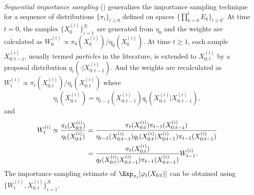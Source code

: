 \documentclass[11pt, fontset=Minion, showoverfull,
bib, mintcode, minted=cache]{marticle}
\begin{document}
\emph{Sequential importance sampling} (\sis) generalizes the importance
sampling technique for a sequence of distributions $\{\pi_t\}_{t\ge0}$ defined
on spaces $\{\prod_{k=0}^tE_k\}_{t\ge0}$. At time $t = 0$, the samples
$\{X_0^{(i)}\}_{i=1}^N$ are generated from $\eta_0$ and the weights are
calculated as $W_0^{(i)} \propto \pi_0(X_0^{(i)})/\eta_0(X_0^{(i)})$. At time
$t\ge1$, each sample $X_{0:t-1}^{(i)}$, usually termed \emph{particles} in the
literature, is extended to $X_{0:t}^{(i)}$ by a proposal distribution
$q_t(\cdot|X_{0:t-1}^{(i)})$. And the weights are recalculated as $W_t^{(i)}
\propto \pi_t(X_{0:t}^{(i)})/\eta_t(X_{0:t}^{(i)})$ where
\begin{equation}
  \eta_t(X_{0:t}^{(i)}) =
  \eta_{t-1}(X_{0:t-1}^{(i)})q_t(X_{0:t}^{(i)}|X_{0:t-1}^{(i)}),
\end{equation}
and
\begin{align}
  W_t^{(i)} \propto \frac{\pi_t(X_{0:t}^{(i)})}{\eta_t(X_{0:t}^{(i)})}
  &= \frac{\pi_t(X_{0:t}^{(i)})\pi_{t-1}(X_{0:t-1}^{(i)})}
  {\eta_{t-1}(X_{0:t-1}^{(i)})q_t(X_{0:t}^{(i)}|X_{0:t-1}^{(i)})
    \pi_{t-1}(X_{0:t-1}^{(i)})} \notag\\
  &= \frac{\pi_t(X_{0:t}^{(i)})}
  {q_t(X_{0:t}^{(i)}|X_{0:t-1}^{(i)})\pi_{t-1}(X_{0:t-1}^{(i)})}W_{t-1}^{(i)}.
  \label{eq:si}
\end{align}
The importance sampling estimate of $\Exp_{\pi_t}[\varphi_t(X_{0:t})]$ can be
obtained using $\{W_t^{(i)},X_{0:t}^{(i)}\}_{i=1}^N$.
\end{document}
